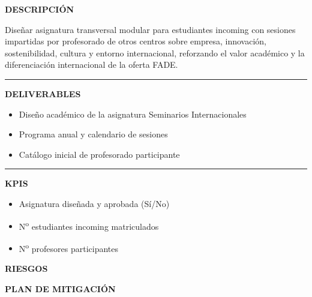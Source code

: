 \documentclass[11pt,a4paper]{scrreprt}
\newcommand{\fieldlabel}[1]{%
  {\footnotesize\sffamily\bfseries\color{mutedcolor}\MakeUppercase{#1}}\par\nopagebreak[4]
}
\newcommand{\fieldsep}{\vspace{3pt}\noindent\textcolor{bordercolor}{\rule{\linewidth}{0.4pt}}\vspace{3pt}\par}
\begin{document}
\begin{tcolorbox}[pabox={fgcolor}{PA3.2 \enspace\textbullet\enspace Creación de Seminarios Internacionales FADE}]

\fieldlabel{Descripci\'on}
{\small Diseñar asignatura transversal modular para estudiantes incoming con sesiones impartidas por profesorado de otros centros sobre empresa, innovación, sostenibilidad, cultura y entorno internacional, reforzando el valor académico y la diferenciación internacional de la oferta FADE. }\par
\fieldsep
\fieldlabel{Deliverables}
{\small \begin{itemize}[noitemsep,topsep=2pt]
\item Diseño académico de la asignatura Seminarios Internacionales
\item Programa anual y calendario de sesiones
\item Catálogo inicial de profesorado participante
\end{itemize}}\par
\fieldsep
\fieldlabel{KPIs}
{\small \begin{itemize}[noitemsep,topsep=2pt]
\item Asignatura diseñada y aprobada (Sí/No)
\item N\textsuperscript{o} estudiantes incoming matriculados
\item N\textsuperscript{o} profesores participantes
\end{itemize}}\par
\end{tcolorbox}
\begin{tcolorbox}[riskbox]
{\footnotesize\sffamily\bfseries\color{red!50!black} RIESGOS}\par{}
\end{tcolorbox}
\begin{tcolorbox}[mitbox]
{\footnotesize\sffamily\bfseries\color{green!40!black} PLAN DE MITIGACI\'ON}\par{}
\end{tcolorbox}
\vspace{8pt}
\end{document}
